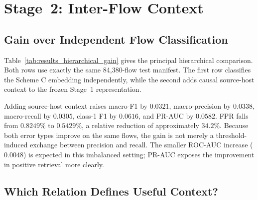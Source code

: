 \documentclass[11pt,fleqn]{report}
\begin{document}
\section{Stage~2: Inter-Flow Context}
\label{subsec:results_stage2}

\subsection{Gain over Independent Flow Classification}
\label{subsubsec:results_hierarchical_gain}

Table~\ref{tab:results_hierarchical_gain} gives the principal hierarchical
comparison. Both rows use exactly the same 84,380-flow test manifest. The first
row classifies the Scheme C embedding independently, while the second adds
causal source-host context to the frozen Stage~1 representation.

\begin{table}[H]
    \centering
    \caption{Independent Stage~1 classification and the complete hierarchical
    system on the common full-data manifest.}
    \label{tab:results_hierarchical_gain}
\end{table}

Adding source-host context raises macro-F1 by $0.0321$, macro-precision by $0.0338$, macro-recall by $0.0305$, class-1 F1 by $0.0616$, and PR-AUC by $0.0582$. FPR falls from $0.8249\%$ to $0.5429\%$, a relative reduction of approximately $34.2\%$. Because both error types improve on the same flows, the gain is not merely a threshold-induced exchange between precision and recall. The smaller ROC-AUC increase ($0.0048$) is expected in this imbalanced setting; PR-AUC exposes the
improvement in positive retrieval more clearly.

\subsection{Which Relation Defines Useful Context?}
\label{subsubsec:results_context_relation}
\end{document}
